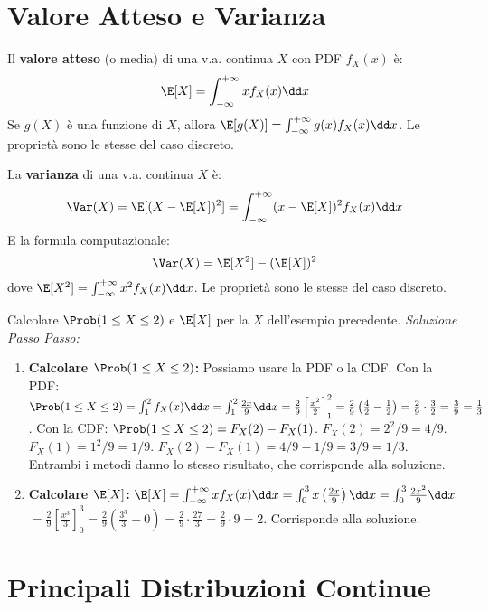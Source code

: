 \section{Valore Atteso e Varianza}
\begin{definition}
Il \textbf{valore atteso} (o media) di una v.a. continua $X$ con PDF $f_X(x)$ è:
\[ \E[X] = \int_{-\infty}^{+\infty} x f_X(x) \dd x \]
Se $g(X)$ è una funzione di $X$, allora $\E[g(X)] = \int_{-\infty}^{+\infty} g(x) f_X(x) \dd x$.
Le proprietà sono le stesse del caso discreto.
\end{definition}

\begin{definition}[Varianza]
La \textbf{varianza} di una v.a. continua $X$ è:
\[ \Var(X) = \E[(X - \E[X])^2] = \int_{-\infty}^{+\infty} (x - \E[X])^2 f_X(x) \dd x \]
E la formula computazionale:
\[ \Var(X) = \E[X^2] - (\E[X])^2 \]
dove $\E[X^2] = \int_{-\infty}^{+\infty} x^2 f_X(x) \dd x$.
Le proprietà sono le stesse del caso discreto.
\end{definition}

\begin{example}
Calcolare $\Prob(1 \le X \le 2)$ e $\E[X]$ per la $X$ dell'esempio precedente.
\textit{Soluzione Passo Passo:}
\begin{enumerate}
    \item \textbf{Calcolare $\Prob(1 \le X \le 2)$:}
    Possiamo usare la PDF o la CDF.
    Con la PDF: $\Prob(1 \le X \le 2) = \int_1^2 f_X(x) \dd x = \int_1^2 \frac{2x}{9} \dd x = \frac{2}{9} \left[ \frac{x^2}{2} \right]_1^2 = \frac{2}{9} \left( \frac{4}{2} - \frac{1}{2} \right) = \frac{2}{9} \cdot \frac{3}{2} = \frac{3}{9} = \frac{1}{3}$.
    Con la CDF: $\Prob(1 \le X \le 2) = F_X(2) - F_X(1)$.
    $F_X(2) = 2^2/9 = 4/9$.
    $F_X(1) = 1^2/9 = 1/9$.
    $F_X(2) - F_X(1) = 4/9 - 1/9 = 3/9 = 1/3$.
    Entrambi i metodi danno lo stesso risultato, che corrisponde alla soluzione.
    \item \textbf{Calcolare $\E[X]$:}
    $\E[X] = \int_{-\infty}^{+\infty} x f_X(x) \dd x = \int_0^3 x \left(\frac{2x}{9}\right) \dd x = \int_0^3 \frac{2x^2}{9} \dd x$
    $= \frac{2}{9} \left[ \frac{x^3}{3} \right]_0^3 = \frac{2}{9} \left( \frac{3^3}{3} - 0 \right) = \frac{2}{9} \cdot \frac{27}{3} = \frac{2}{9} \cdot 9 = 2$.
    Corrisponde alla soluzione.
\end{enumerate}
\end{example}

\section{Principali Distribuzioni Continue}

